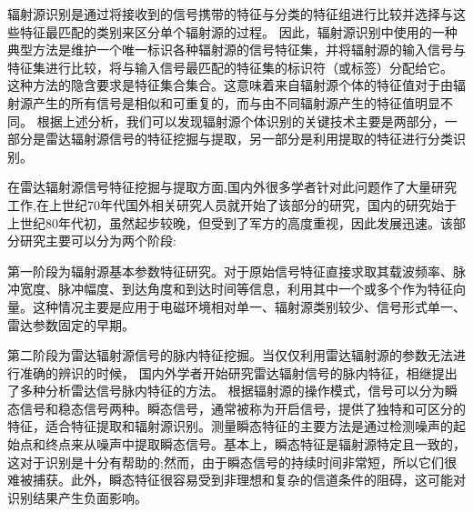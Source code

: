 辐射源识别是通过将接收到的信号携带的特征与分类的特征组进行比较并选择与这些特征最匹配的类别来区分单个辐射源的过程。
因此，辐射源识别中使用的一种典型方法是维护一个唯一标识各种辐射源的信号特征集，并将辐射源的输入信号与特征集进行比较，将与输入信号最匹配的特征集的标识符（或标签）分配给它。
这种方法的隐含要求是特征集合集合。这意味着来自辐射源个体的特征值对于由辐射源产生的所有信号是相似和可重复的，而与由不同辐射源产生的特征值明显不同。
根据上述分析，我们可以发现辐射源个体识别的关键技术主要是两部分，一部分是雷达辐射源信号的特征挖掘与提取，另一部分是利用提取的特征进行分类识别。

在雷达辐射源信号特征挖掘与提取方面,国内外很多学者针对此问题作了大量研究工作,在上世纪70年代国外相关研究人员就开始了该部分的研究，国内的研究始于上世纪80年代初，虽然起步较晚，但受到了军方的高度重视，因此发展迅速。该部分研究主要可以分为两个阶段:

第一阶段为辐射源基本参数特征研究。对于原始信号特征直接求取其载波频率、脉冲宽度、脉冲幅度、到达角度和到达时间等信息，利用其中一个或多个作为特征向量。这种情况主要是应用于电磁环境相对单一、辐射源类别较少、信号形式单一、雷达参数固定的早期。

第二阶段为雷达辐射源信号的脉内特征挖掘。当仅仅利用雷达辐射源的参数无法进行准确的辨识的时候，
国内外学者开始研究雷达辐射信号的脉内特征，相继提出了多种分析雷达信号脉内特征的方法。
根据辐射源的操作模式，信号可以分为瞬态信号和稳态信号两种。瞬态信号，通常被称为开启信号，提供了独特和可区分的特征，适合特征提取和辐射源识别。测量瞬态特征的主要方法是通过检测噪声的起始点和终点来从噪声中提取瞬态信号。基本上，瞬态特征是辐射源特定且一致的，这对于识别是十分有帮助的;然而，由于瞬态信号的持续时间非常短，所以它们很难被捕获。此外，瞬态特征很容易受到非理想和复杂的信道条件的阻碍，这可能对识别结果产生负面影响。

